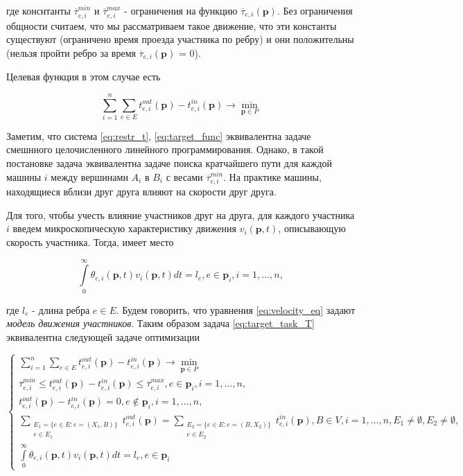 \documentclass[12pt, a4paper]{article}
\DeclareMathOperator*{\minn}{min}
\begin{document}
где конснтанты $\overline{\tau}_{e, i}^{min}$ и $\overline{\tau}_{e, i}^{max}$ - ограничения на функцию $\overline{\tau}_{e, i} (\textbf{p})$. Без ограничения общности считаем, что мы рассматриваем такое движение, что эти константы существуют (ограничено время проезда участника по ребру) и они положительны (нельзя пройти ребро за время $\overline{\tau}_{e, i} (\textbf{p})$ = 0).

Целевая функция в этом случае есть

\begin{equation}
	\label{eq:target_func}
		\sum \limits_{i = 1}^n \sum \limits_{e \in E} t_{e, i}^{out}(\textbf{p}) - t_{e, i}^{in}(\textbf{p}) \rightarrow \minn \limits _{\textbf{p} \in P}
\end{equation}

Заметим, что система \eqref{eq:restr_t}, \eqref{eq:target_func} эквивалентна задаче смешнного целочисленного линейного программирования. Однако, в такой постановке задача эквивалентна задаче поиска кратчайшего пути для каждой машины $i$ между вершинами $A_i$ в $B_i$ с весами $\overline{\tau}_{e, i}^{min}$. На практике машины, находящиеся вблизи друг друга влияют на скорости друг друга.

Для того, чтобы учесть влияние участников друг на друга, для каждого участника $i$ введем микроскопическую характеристику движения $v_i(\textbf{p}, t)$, описывающую скорость участника.
Тогда, имеет место

\begin{equation}
\label{eq:velocity_eq}
\int\limits_{0}^{\infty} \theta_{e, i} (\textbf{p}, t) v_i(\textbf{p}, t) dt = l_e, e \in \textbf{p}_i, i = 1, \dots, n,
\end{equation}

где $l_e$ - длина ребра $e \in E$. Будем говорить, что уравнения \eqref{eq:velocity_eq} задают \textit{модель движения участников}. Таким образом задача \eqref{eq:target_task_T} эквивалентна следующей задаче оптимизации

\begin{equation}
\label{eq:target_task_theta_v}
\begin{cases}
	\sum \limits_{i = 1}^n \sum \limits_{e \in E} t_{e, i}^{out}(\textbf{p}) - t_{e, i}^{in}(\textbf{p}) \rightarrow \minn \limits _{\textbf{p} \in P}
	\\
	\overline{\tau}_{e, i}^{min} \le t_{e, i}^{out}(\textbf{p}) - t_{e, i}^{in}(\textbf{p}) \le \overline{\tau}_{e, i}^{max}, e \in \textbf{p}_i, i = 1, \dots, n,
	\\
	t_{e, i}^{out}(\textbf{p}) - t_{e, i}^{in}(\textbf{p}) = 0, e \notin \textbf{p}_i, i = 1, \dots, n,
	\\
	\sum \limits_{ \substack{E_1 = \{ e \in E: e = (X_1, B) \} \\ e \in E_1}} t_{e, i}^{out} (\textbf{p}) = \sum \limits_{ \substack{E_2 = \{ e \in E: e = (B, X_2) \} \\ e \in E_2}} t_{e, i}^{in} (\textbf{p}), B \in V, i = 1, \dots, n, E_1 \ne \emptyset, E_2 \ne \emptyset,
	\\
	\int\limits_{0}^{\infty} \theta_{e, i} (\textbf{p}, t) v_i(\textbf{p}, t) dt = l_e, e \in \textbf{p}_i
\end{cases}
\end{equation}
\end{document}
